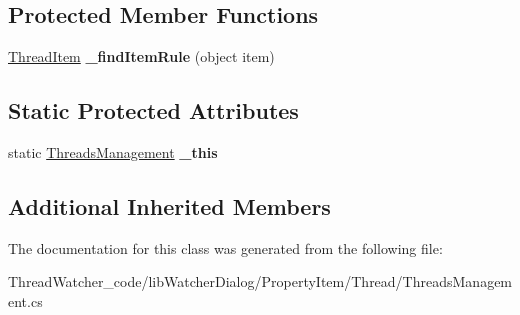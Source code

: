 \subsection*{Protected Member Functions}
\begin{DoxyCompactItemize}
\item 
\hypertarget{classlib_watcher_dialog_1_1_property_item_1_1_thread_1_1_threads_management_aeb1385bf87d5e2b8644f58f5ba96e125}{\hyperlink{classlib_watcher_dialog_1_1_property_item_1_1_thread_1_1_thread_item}{Thread\+Item} {\bfseries \+\_\+find\+Item\+Rule} (object item)}\label{classlib_watcher_dialog_1_1_property_item_1_1_thread_1_1_threads_management_aeb1385bf87d5e2b8644f58f5ba96e125}

\end{DoxyCompactItemize}
\subsection*{Static Protected Attributes}
\begin{DoxyCompactItemize}
\item 
\hypertarget{classlib_watcher_dialog_1_1_property_item_1_1_thread_1_1_threads_management_a54d45d2ac3e31d5ab841948c5d61d7b2}{static \hyperlink{classlib_watcher_dialog_1_1_property_item_1_1_thread_1_1_threads_management}{Threads\+Management} {\bfseries \+\_\+this}}\label{classlib_watcher_dialog_1_1_property_item_1_1_thread_1_1_threads_management_a54d45d2ac3e31d5ab841948c5d61d7b2}

\end{DoxyCompactItemize}
\subsection*{Additional Inherited Members}


The documentation for this class was generated from the following file\+:\begin{DoxyCompactItemize}
\item 
Thread\+Watcher\+\_\+code/lib\+Watcher\+Dialog/\+Property\+Item/\+Thread/Threads\+Management.\+cs\end{DoxyCompactItemize}

